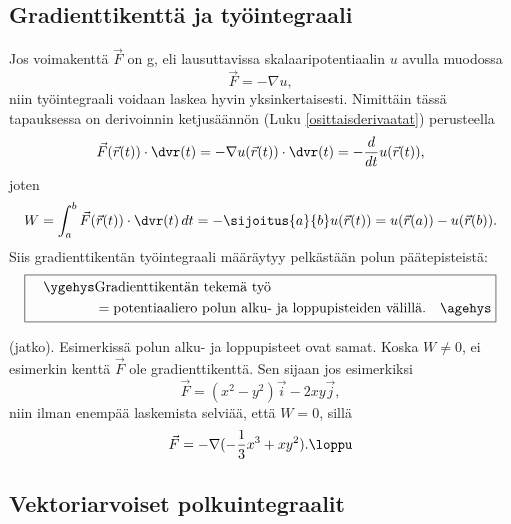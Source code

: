 \subsection{Gradienttikenttä ja työintegraali}

Jos voimakenttä $\vec F$ on g, eli lausuttavissa skalaaripotentiaalin $u$
avulla muodossa
\[
\vec F=-\nabla u,
\]
niin työintegraali voidaan laskea hyvin yksinkertaisesti. Nimittäin tässä tapauksessa on
derivoinnin ketjusäännön (Luku \ref{osittaisderivaatat}) perusteella
\[
\vec F(\vec r(t))\cdot \dvr(t) = -\nabla u(\vec r(t))\cdot \dvr(t)
                               = -\frac{d}{dt} u(\vec r(t)),
\]
joten
\[
W = \int_a^b \vec F(\vec r(t))\cdot \dvr(t)\,dt 
  = -\sijoitus{a}{b} u(\vec r(t))
  = u(\vec r(a))-u(\vec r(b)).
\]
Siis gradienttikentän työintegraali määräytyy pelkästään polun päätepisteistä:
\[ 
\boxed{ \begin{aligned} \quad\ygehys 
                 &\text{Gradienttikentän tekemä työ} \\
                 &= \text{potentiaaliero polun alku- ja loppupisteiden välillä}. \quad\agehys
           \end{aligned} } 
\]

\jatko \begin{Exa} (jatko). Esimerkissä polun alku- ja loppupisteet ovat samat. Koska
$W\neq 0$, ei esimerkin kenttä $\vec F$ ole gradienttikenttä. Sen sijaan jos esimerkiksi
\[
\vec F=(x^2-y^2)\vec i-2xy\vec j,
\]
niin ilman enempää laskemista selviää, että $W=0$, sillä
\[
\vec F=-\nabla(-\frac{1}{3}x^3+xy^2). \loppu
\]
\end{Exa}

\subsection{Vektoriarvoiset polkuintegraalit}

